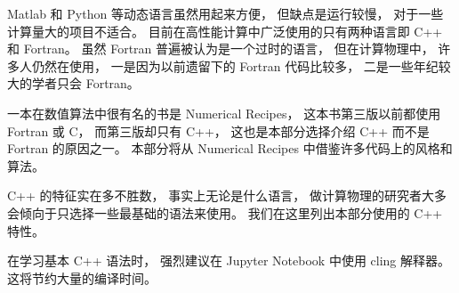 
Matlab 和 Python 等动态语言虽然用起来方便， 但缺点是运行较慢， 对于一些计算量大的项目不适合。 目前在高性能计算中广泛使用的只有两种语言即 C++ 和 Fortran。 虽然 Fortran 普遍被认为是一个过时的语言， 但在计算物理中， 许多人仍然在使用， 一是因为以前遗留下的 Fortran 代码比较多， 二是一些年纪较大的学者只会 Fortran。

一本在数值算法中很有名的书是 Numerical Recipes， 这本书第三版以前都使用 Fortran 或 C， 而第三版却只有 C++， 这也是本部分选择介绍 C++ 而不是 Fortran 的原因之一。 本部分将从 Numerical Recipes 中借鉴许多代码上的风格和算法。

C++ 的特征实在多不胜数， 事实上无论是什么语言， 做计算物理的研究者大多会倾向于只选择一些最基础的语法来使用。 我们在这里列出本部分使用的 C++ 特性。

在学习基本 C++ 语法时， 强烈建议在 Jupyter Notebook 中使用 cling 解释器。 这将节约大量的编译时间。

